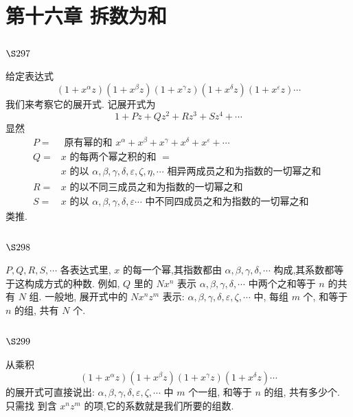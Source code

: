 \chapter{第十六章 拆数为和}

\section{$\S 297$}

给定表达式
\[
\left(1+x^{\alpha} z\right)\left(1+x^{\beta} z\right)\left(1+x^{\gamma} z\right)\left(1+x^{\delta} z\right)\left(1+x^{\varepsilon} z\right) \cdots
\]
我们来考察它的展开式. 记展开式为
\[
1+P z+Q z^{2}+R z^{3}+S z^{4}+\cdots
\]
显然
\[
\begin{aligned}
P= & \text { 原有幂的和 } x^{\alpha}+x^{\beta}+x^{\gamma}+x^{\delta}+x^{\varepsilon}+\cdots \\
Q= & x \text { 的每两个幂之积的和 }= \\
& x \text { 的以 } \alpha, \beta, \gamma, \delta, \varepsilon, \zeta, \eta, \cdots \text { 相异两成员之和为指数的一切幂之和 } \\
R= & x \text { 的以不同三成员之和为指数的一切幂之和 } \\
S= & x \text { 的以 } \alpha, \beta, \gamma, \delta, \varepsilon \cdots \text { 中不同四成员之和为指数的一切幂之和 }
\end{aligned}
\]
类推.

\section{$\S 298$}

$P, Q, R, S, \cdots$ 各表达式里, $x$ 的每一个幂,其指数都由 $\alpha, \beta, \gamma, \delta, \cdots$ 构成,其系数都等 于这构成方式的种数. 例如, $Q$ 里的 $N x^{n}$ 表示 $\alpha, \beta, \gamma, \delta, \cdots$ 中两个之和等于 $n$ 的共有 $N$ 组. 一般地, 展开式中的 $N x^{n} z^{m}$ 表示: $\alpha, \beta, \gamma, \delta, \varepsilon, \zeta, \cdots$ 中, 每组 $m$ 个, 和等于 $n$ 的组, 共有 $N$ 个.

\section{$\S 299$}

从乘积
\[
\left(1+x^{\alpha} z\right)\left(1+x^{\beta} z\right)\left(1+x^{\gamma} z\right)\left(1+x^{\delta} z\right) \cdots
\]
的展开式可直接说出: $\alpha, \beta, \gamma, \delta, \varepsilon, \zeta, \cdots$ 中 $m$ 个一组, 和等于 $n$ 的组, 共有多少个. 只需找 到含 $x^{n} z^{m}$ 的项,它的系数就是我们所要的组数. 

